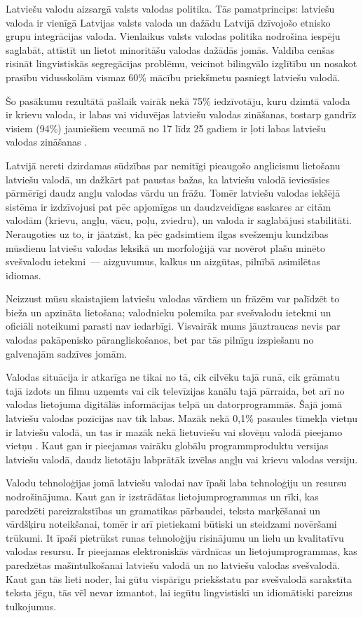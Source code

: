 \begin{multicols}{2}
Latviešu valodu aizsargā valsts valodas politika.
Tās pamatprincips: latviešu valoda ir vienīgā Latvijas valsts valoda un dažādu Latvijā dzīvojošo etnisko grupu integrācijas valoda.
Vienlaikus valsts valodas politika nodrošina iespēju saglabāt, attīstīt un lietot minoritāšu valodas dažādās jomās.
Valdība cenšas risināt lingvistiskās segregācijas problēmu, veicinot bilingvālo izglītību un nosakot prasību vidusskolām vismaz 60\% mācību priekšmetu pasniegt latviešu valodā. 

Šo pasākumu rezultātā pašlaik vairāk nekā 75\% iedzīvotāju, kuru dzimtā valoda ir krievu valoda, ir labas vai viduvējas latviešu valodas zināšanas, tostarp gandrīz visiem (94\%) jauniešiem vecumā no 17 līdz 25 gadiem ir ļoti labas latviešu valodas zināšanas \cite{Meta3ES}. 

Latvijā nereti dzirdamas sūdzības par nemitīgi pieaugošo anglicismu lietošanu latviešu valodā, un dažkārt pat paustas bažas, ka latviešu valodā ieviesīsies pārmērīgi daudz angļu valodas vārdu un frāžu.
Tomēr latviešu valodas iekšējā sistēma ir izdzīvojusi pat pēc apjomīgas un daudzveidīgas saskares ar citām valodām (krievu, angļu, vācu, poļu, zviedru), un valoda ir saglabājusi stabilitāti.
Neraugoties uz to, ir jāatzīst, ka pēc gadsimtiem ilgas svešzemju kundzības mūsdienu latviešu valodas leksikā un morfoloģijā var novērot plašu minēto svešvalodu ietekmi~--- aizguvumus, kalkus un aizgūtas, pilnībā asimilētas idiomas. 

Neizzust mūsu skaistajiem latviešu valodas vārdiem un frāzēm var palīdzēt to bieža un apzināta lietošana; valodnieku polemika par svešvalodu ietekmi un oficiāli noteikumi parasti nav iedarbīgi.
Visvairāk mums jāuztraucas nevis par valodas pakāpenisko pārangliskošanos, bet par tās pilnīgu izspiešanu no galvenajām sadzīves jomām.

Valodas situācija ir atkarīga ne tikai no tā, cik cilvēku tajā runā, cik grāmatu tajā izdots un filmu uzņemts vai cik televīzijas kanālu tajā pārraida, bet arī no valodas lietojuma digitālās informācijas telpā un datorprogrammās.
Šajā jomā latviešu valodas pozīcijas nav tik labas.
Mazāk nekā 0,1\% pasaules tīmekļa vietņu ir latviešu valodā, un tas ir mazāk nekā lietuviešu vai slovēņu valodā pieejamo vietņu \cite{Meta4ES}.
Kaut gan ir pieejamas vairāku globālu programmproduktu versijas latviešu valodā, daudz lietotāju labprātāk izvēlas angļu vai krievu valodas versiju. 

Valodu tehnoloģijas jomā latviešu valodai nav īpaši laba tehnoloģiju un resursu nodrošinājuma.
Kaut gan ir izstrādātas lietojumprogrammas un rīki, kas paredzēti pareizrakstības un gramatikas pārbaudei, teksta marķēšanai un vārdšķiru noteikšanai, tomēr ir arī pietiekami būtiski un steidzami novēršami trūkumi.
It īpaši pietrūkst runas tehnoloģiju risinājumu un lielu un kvalitatīvu valodas resursu.
Ir pieejamas elektroniskās vārdnīcas un lietojumprogrammas, kas paredzētas mašīntulkošanai latviešu valodā un no latviešu valodas svešvalodā.
Kaut gan tās lieti noder, lai gūtu vispārīgu priekšstatu par svešvalodā sarakstīta teksta jēgu, tās vēl nevar \mbox{izmantot}, lai iegūtu lingvistiski un idiomātiski pareizus tulkojumus.


\end{multicols}

